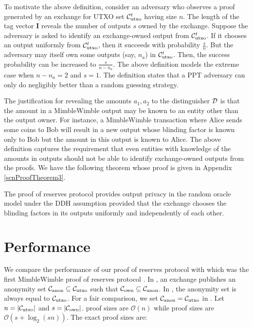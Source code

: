   To motivate the above definition, consider an adversary who observes a \RPlus proof generated by an exchange for UTXO set $\mathcal{C}_{\text{utxo}}^t$ having size $n$. 
  The length of the tag vector $\textbf{I}$ reveals the number of outputs $s$ owned by the exchange. 
  Suppose the adversary is asked to identify an exchange-owned output from $\mathcal{C}_{\text{utxo}}^t$. 
  If it chooses an output uniformly from $\mathcal{C}_{\text{utxo}}^t$, then it succeeds with probability $\frac{s}{n}$. But the adversary may itself own some outputs (say, $n_a$) in $\mathcal{C}_\text{utxo}^t$.
  Then, the success probability can be increased to $\frac{s}{n-n_a}$. The above definition models the extreme case when $n-n_a = 2$ and $s=1$. The definition states that a \textsf{PPT} adversary can only do negligibly better than a random guessing strategy.
  
  The justification for revealing the amounts $a_1, a_2$ to the distinguisher $\mathcal{D}$ is that the amount in a MimbleWimble output may be known to an entity other than the output owner. For instance, a MimbleWimble transaction where Alice sends some coins to Bob will result in a new output whose blinding factor is known only to Bob but the amount in this output is known to Alice.
  The above definition captures the requirement that even entities with knowledge of the amounts in outputs should not be able to identify exchange-owned outputs from the \RPlus proofs. We have the following theorem whose proof is given in Appendix \ref{scnProofTheorem3}.
  \begin{theorem}
  The \RPlus proof of reserves protocol provides output privacy in the random oracle model under the DDH assumption provided that the exchange chooses the blinding factors in its outputs uniformly and independently of each other.
  \label{label:thm3}
  \end{theorem}


  \section{Performance}
  We compare the performance of our proof of reserves protocol with \R which was the first MimbleWimble proof of reserves protocol \cite{Dutta2019b}.
  In \Rw, an exchange publishes an anonymity set $\mathcal{C}_{\text{anon}} \subseteq \mathcal{C}_{\text{utxo}}$ such that $\mathcal{C}_{\text{own}} \subseteq \mathcal{C}_{\text{anon}}$. 
  In \Rplus, the anonymity set is always equal to $\mathcal{C}_{\text{utxo}}$. For a fair comparison, we set $\mathcal{C}_{\text{anon}} = \mathcal{C}_{\text{utxo}}$ in \Rw. Let $n = \left| \mathcal{C}_{\text{utxo}} \right|$ and $s = \left|\mathcal{C}_{\text{own}}\right|$. 
  \R proof sizes are $\mathcal{O}(n)$ while \RPlus proof sizes are $\mathcal{O}(s+\log_2(sn))$. 
  The exact proof sizes are:

